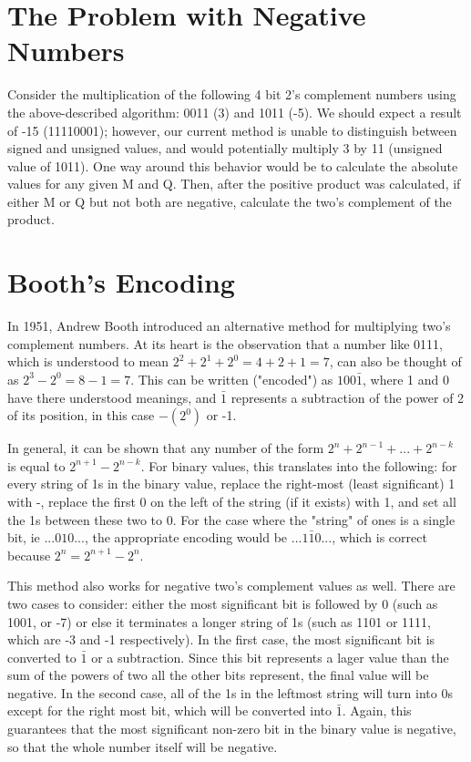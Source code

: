 \documentclass{article}
\begin{document}
\section{The Problem with Negative Numbers}
Consider the multiplication of the following 4 bit 2's complement numbers using the above-described algorithm: 0011 (3) and 1011 (-5). We should expect a result of -15 (11110001); however, our current method is unable to distinguish between signed and unsigned values, and would potentially multiply 3 by 11 (unsigned value of 1011). One way around this behavior would be to calculate the absolute values for any given M and Q. Then, after the positive product was calculated, if either M or Q but not both are negative, calculate the two's complement of the product.

\section{Booth's Encoding}
In 1951, Andrew Booth introduced an alternative method for multiplying two's complement numbers. At its heart is the observation that a number like 0111, which is understood to mean $2^2 + 2^1 + 2^0 = 4 + 2 + 1 = 7$, can also be thought of as $2^3 - 2^0 = 8 - 1 = 7$. This can be written ("encoded") as $100\bar{1}$, where 1 and 0 have there understood meanings, and $\bar{1}$ represents a subtraction of the power of 2 of its position, in this case $-(2^0)$ or -1.

    In general, it can be shown that any number of the form $2^n + 2^{n-1} + ... + 2^{n-k}$ is equal to $2^{n+1} - 2^{n-k}$. For binary values, this translates into the following: for every string of 1s in the binary value, replace the right-most (least significant) 1 with -, replace the first 0 on the left of the string (if it exists) with 1, and set all the 1s between these two to 0. For the case where the "string" of ones is a single bit, ie $...010...$, the appropriate encoding would be $...1\bar{1}0...$, which is correct because $2^n = 2^{n+1} - 2^n$.

This method also works for negative two's complement values as well. There are two cases to consider: either the most significant bit is followed by 0 (such as 1001, or -7) or else it terminates a longer string of 1s (such as 1101 or 1111, which are -3 and -1 respectively). In the first case, the most significant bit is converted to $\bar{1}$ or a subtraction. Since this bit represents a lager value than the sum of the powers of two all the other bits represent, the final value will be negative. In the second case, all of the 1s in the leftmost string will turn into 0s except for the right most bit, which will be converted into $\bar{1}$. Again, this guarantees that the most significant non-zero bit in the binary value is negative, so that the whole number itself will be negative.
\end{document}
